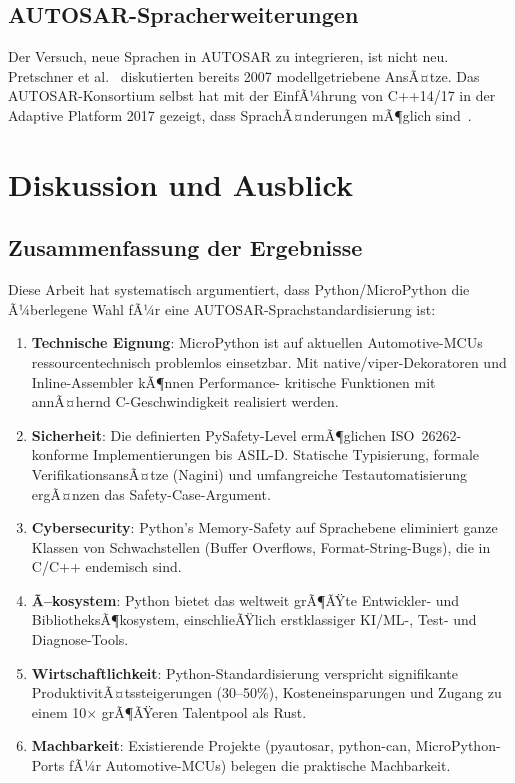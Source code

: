 ﻿\documentclass[12pt,a4paper,twoside]{article}
\begin{document}
\subsection{AUTOSAR-Spracherweiterungen}

Der Versuch, neue Sprachen in AUTOSAR zu integrieren, ist nicht neu.
Pretschner et al.~\cite{pretschner2007software} diskutierten bereits 2007 modellgetriebene
AnsÃ¤tze. Das AUTOSAR-Konsortium selbst hat mit der EinfÃ¼hrung von C++14/17
in der Adaptive Platform 2017 gezeigt, dass SprachÃ¤nderungen mÃ¶glich sind~\cite{autosar_ap_explained2019}.

\section{Diskussion und Ausblick}
\label{sec:fazit}

\subsection{Zusammenfassung der Ergebnisse}
\label{subsec:zusammenfassung}

Diese Arbeit hat systematisch argumentiert, dass Python/MicroPython
die Ã¼berlegene Wahl fÃ¼r eine AUTOSAR-Sprachstandardisierung ist:

\begin{enumerate}
  \item \textbf{Technische Eignung}: MicroPython ist auf aktuellen
        Automotive-MCUs ressourcentechnisch problemlos einsetzbar.
        Mit native/viper-Dekoratoren und Inline-Assembler kÃ¶nnen Performance-
        kritische Funktionen mit annÃ¤hernd C-Geschwindigkeit realisiert werden.
  \item \textbf{Sicherheit}: Die definierten PySafety-Level ermÃ¶glichen
        ISO~26262-konforme Implementierungen bis ASIL-D.
        Statische Typisierung, formale VerifikationsansÃ¤tze (Nagini)
        und umfangreiche Testautomatisierung ergÃ¤nzen das Safety-Case-Argument.
  \item \textbf{Cybersecurity}: Python's Memory-Safety auf Sprachebene
        eliminiert ganze Klassen von Schwachstellen (Buffer Overflows,
        Format-String-Bugs), die in C/C++ endemisch sind.
  \item \textbf{Ã–kosystem}: Python bietet das weltweit grÃ¶ÃŸte Entwickler-
        und BibliotheksÃ¶kosystem, einschlieÃŸlich erstklassiger KI/ML-,
        Test- und Diagnose-Tools.
  \item \textbf{Wirtschaftlichkeit}: Python-Standardisierung verspricht
        signifikante ProduktivitÃ¤tssteigerungen (30--50\%), Kosteneinsparungen
        und Zugang zu einem 10$\times$ grÃ¶ÃŸeren Talentpool als Rust.
  \item \textbf{Machbarkeit}: Existierende Projekte (pyautosar, python-can,
        MicroPython-Ports fÃ¼r Automotive-MCUs) belegen die praktische
        Machbarkeit.
\end{enumerate}
\end{document}
